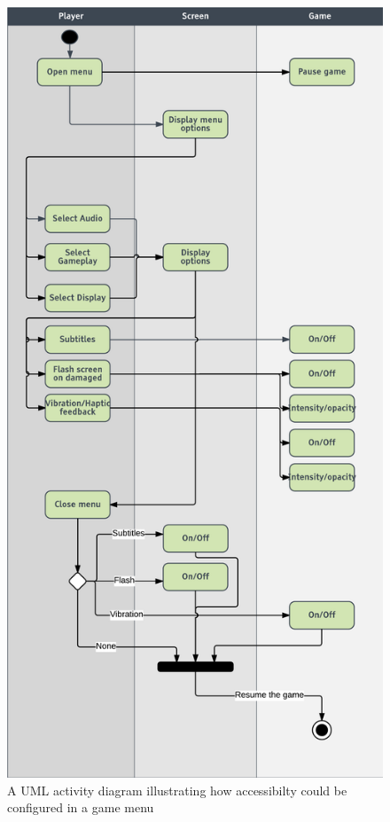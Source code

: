 \documentclass{scrartcl}
\begin{document}
\begin{figure}
\centering
\includegraphics [scale=0.4]{image}
\caption{A UML activity diagram illustrating how accessibilty could be configured in a game menu}
\label{fig:image}
\end{figure}
\end{document}
